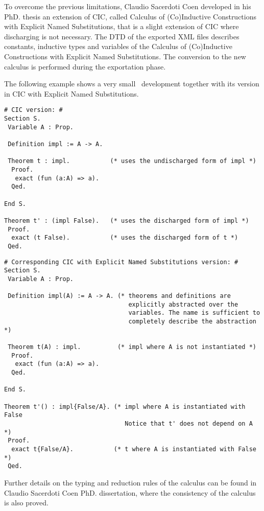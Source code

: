 To overcome the previous limitations, Claudio Sacerdoti Coen developed in his
PhD. thesis an extension of CIC, called Calculus of (Co)Inductive Constructions
with Explicit Named Substitutions, that is a slight extension of CIC where
discharging is not necessary. The DTD of the exported XML files describes
constants, inductive types and variables of the Calculus of (Co)Inductive
Constructions with Explicit Named Substitutions. The conversion to the new
calculus is performed during the exportation phase.

The following example shows a very small \Coq\ development together with its
version in CIC with Explicit Named Substitutions.

\begin{verbatim}
# CIC version: #
Section S.
 Variable A : Prop.

 Definition impl := A -> A.

 Theorem t : impl.           (* uses the undischarged form of impl *)
  Proof.
   exact (fun (a:A) => a).
  Qed.

End S.

Theorem t' : (impl False).   (* uses the discharged form of impl *)
 Proof.
  exact (t False).           (* uses the discharged form of t *)
 Qed.
\end{verbatim}
 
\begin{verbatim}
# Corresponding CIC with Explicit Named Substitutions version: #
Section S.
 Variable A : Prop.
 
 Definition impl(A) := A -> A. (* theorems and definitions are
                                  explicitly abstracted over the
                                  variables. The name is sufficient to
                                  completely describe the abstraction *)
 
 Theorem t(A) : impl.          (* impl where A is not instantiated *)
  Proof.
   exact (fun (a:A) => a).
  Qed.
 
End S.
 
Theorem t'() : impl{False/A}. (* impl where A is instantiated with False
                                 Notice that t' does not depend on A     *)
 Proof.
  exact t{False/A}.           (* t where A is instantiated with False *)
 Qed.
\end{verbatim}
 
Further details on the typing and reduction rules of the calculus can be
found in Claudio Sacerdoti Coen PhD. dissertation, where the consistency
of the calculus is also proved.
 
